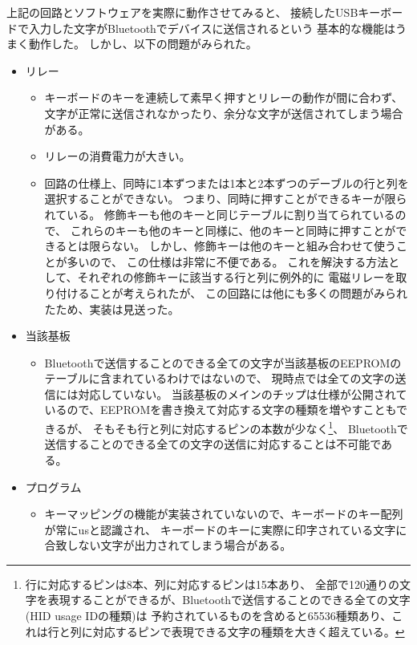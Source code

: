 上記の回路とソフトウェアを実際に動作させてみると、
接続したUSBキーボードで入力した文字がBluetoothでデバイスに送信されるという
基本的な機能はうまく動作した。
しかし、以下の問題がみられた。
\begin{itemize}
 \item リレー
  \begin{itemize}
   \item キーボードのキーを連続して素早く押すとリレーの動作が間に合わず、
          文字が正常に送信されなかったり、余分な文字が送信されてしまう場合がある。
   \item リレーの消費電力が大きい。
   \item 回路の仕様上、同時に1本ずつまたは1本と2本ずつのデーブルの行と列を選択することができない。
          つまり、同時に押すことができるキーが限られている。
          修飾キーも他のキーと同じテーブルに割り当てられているので、
          これらのキーも他のキーと同様に、他のキーと同時に押すことができるとは限らない。
          しかし、修飾キーは他のキーと組み合わせて使うことが多いので、
          この仕様は非常に不便である。
          これを解決する方法として、それぞれの修飾キーに該当する行と列に例外的に
          電磁リレーを取り付けることが考えられたが、
          この回路には他にも多くの問題がみられたため、実装は見送った。
  \end{itemize}
 \item 当該基板
  \begin{itemize}
   \item Bluetoothで送信することのできる全ての文字が当該基板のEEPROMのテーブルに含まれているわけではないので、
         現時点では全ての文字の送信には対応していない。
         当該基板のメインのチップは仕様が公開されているので、EEPROMを書き換えて対応する文字の種類を増やすこともできるが、
         そもそも行と列に対応するピンの本数が少なく\footnote{行に対応するピンは8本、列に対応するピンは15本あり、
         全部で120通りの文字を表現することができるが、Bluetoothで送信することのできる全ての文字(HID usage IDの種類)は
         予約されているものを含めると65536種類あり、これは行と列に対応するピンで表現できる文字の種類を大きく超えている。}、
         Bluetoothで送信することのできる全ての文字の送信に対応することは不可能である。
  \end{itemize}
 \item プログラム
  \begin{itemize}
   \item キーマッピングの機能が実装されていないので、キーボードのキー配列が常にusと認識され、
         キーボードのキーに実際に印字されている文字に合致しない文字が出力されてしまう場合がある。
  \end{itemize}
\end{itemize}
